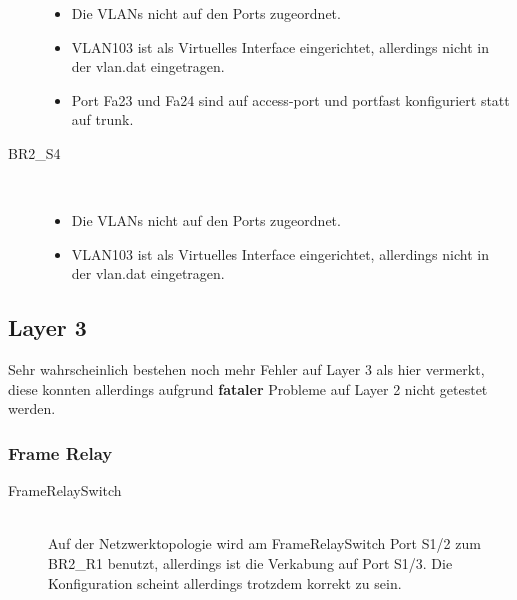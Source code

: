 \begin{description}
	  \begin{itemize}
	  	\item Die VLANs nicht auf den Ports zugeordnet.
		  \item VLAN103 ist als Virtuelles Interface eingerichtet, allerdings nicht in der vlan.dat eingetragen.
		  \item Port Fa23 und Fa24 sind auf access-port und portfast konfiguriert statt auf trunk.
		\end{itemize}
	\item[BR2\_S4] \hfill \\
	  \begin{itemize}
	  	\item Die VLANs nicht auf den Ports zugeordnet.
		  \item VLAN103 ist als Virtuelles Interface eingerichtet, allerdings nicht in der vlan.dat eingetragen.
		\end{itemize}
\end{description}

\subsection{Layer 3}
Sehr wahrscheinlich bestehen noch mehr Fehler auf Layer 3 als hier vermerkt, diese konnten allerdings aufgrund \textbf{fataler} Probleme auf Layer 2 nicht getestet werden.
\subsubsection{Frame Relay}
\begin{description}
	\item[FrameRelaySwitch] \hfill \\
	Auf der Netzwerktopologie wird am FrameRelaySwitch Port S1/2 zum BR2\_R1 benutzt, allerdings ist die Verkabung auf Port S1/3. Die Konfiguration scheint allerdings trotzdem korrekt zu sein.
\end{description}

